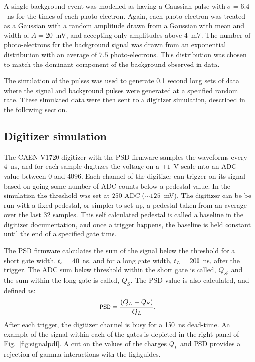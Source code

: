 \documentclass[letter,twocolumn,preprint,3p]{elsarticle}
\begin{document}
A single background event was modelled as having a Gaussian pulse with
$\sigma=6.4$~ns for the times of each photo-electron.  Again, each
photo-electron was treated as a Gaussian with a random amplitude drawn
from a Gaussian with mean and width of $A=20$~mV, and accepting only
amplitudes above 4~mV.  The number of photo-electrons for the
background signal was drawn from an exponential distribution with an
average of $7.5$ photo-electrons.  This distribution was chosen to match
the dominant component of the background observed in data.

The simulation of the pulses was used to generate 0.1 second long sets
of data where the signal and background pulses were generated at a
specified random rate.  These simulated data were then sent to a
digitizer simulation, described in the following section.


\subsection{ Digitizer simulation }\label{sec:digisim}
 
The CAEN V1720 digitizer with the PSD firmware samples the waveforms
every 4~ns, and for each sample digitizes the voltage on a $\pm 1$~V
scale into an ADC value between 0 and 4096.  Each channel of the
digitizer can trigger on its signal based on going some number of ADC
counts below a pedestal value.  In the simulation the threshold was
set at 250 ADC ($\sim 125$~mV).  The digitizer can be be run with a
fixed pedestal, or simpler to set up, a pedestal taken from an average
over the last 32 samples.  This self calculated pedestal is called a
baseline in the digitizer documentation, and once a trigger happens,
the baseline is held constant until the end of a specified gate time.

The PSD firmware calculates the sum of the signal below the threshold
for a short gate width, $t_s=40$~ns, and for a long gate width,
$t_L=200$~ns, after the trigger.  The ADC sum below threshold within
the short gate is called, $Q_S$, and the sum within the long gate is
called, $Q_S$.  The PSD value is also calculated, and defined as:
\begin{equation}
{\tt PSD} = \frac{ (Q_L - Q_S)} { Q_L }.
\end{equation}
After each trigger, the digitizer channel is busy for a 150~ns
dead-time.  An example of the signal within each of the gates is
depicted in the right panel of Fig.~\ref{fig:signalpdf}.  A cut on the
values of the charges $Q_L$ and PSD provides a rejection of gamma
interactions with the lighguides.
\end{document}
